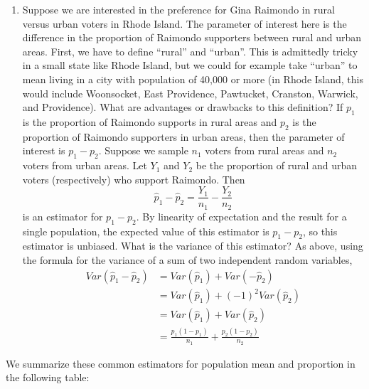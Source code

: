 \documentclass[12pt]{article}
\theoremstyle{definition}
\theoremstyle{remark}
\begin{document}
\begin{enumerate}
\item Suppose we are interested in the preference for Gina Raimondo in rural versus urban voters in Rhode Island. The parameter of interest here is the difference in the proportion of Raimondo supporters between rural and urban areas. First, we have to define ``rural'' and ``urban''. This is admittedly tricky in a small state like Rhode Island, but we could for example take ``urban'' to mean living in a city with population of 40,000 or more (in Rhode Island, this would include Woonsocket, East Providence, Pawtucket, Cranston, Warwick, and Providence). What are advantages or drawbacks to this definition? If $p_1$ is the proportion of Raimondo supports in rural areas and $p_2$ is the proportion of Raimondo supporters in urban areas, then the parameter of interest is $p_1 - p_2$. Suppose we sample $n_1$ voters from rural areas and $n_2$ voters from urban areas. Let $Y_1$ and $Y_2$ be the proportion of rural and urban voters (respectively) who support Raimondo. Then
\[
\hat{p}_1 - \hat{p}_2 = \frac{Y_1}{n_1} - \frac{Y_2}{n_2}
\]
is an estimator for $p_1 - p_2$. By linearity of expectation and the result for a single population, the expected value of this estimator is $p_1 - p_2$, so this estimator is unbiased. What is the variance of this estimator? As above, using the formula for the variance of a sum of two independent random variables,
\begin{align*}
Var(\hat{p}_1 - \hat{p}_2 ) &= Var(\hat{p}_1) + Var(- \hat{p}_2) \\
&= Var(\hat{p}_1) + (-1)^2 Var(\hat{p}_2)\\
&= Var(\hat{p}_1) + Var(\hat{p}_2) \\
&= \frac{p_1(1-p_1)}{n_1} + \frac{p_2(1-p_2)}{n_2}
\end{align*}
\end{enumerate}

We summarize these common estimators for population mean and proportion in the following table:
\end{document}
